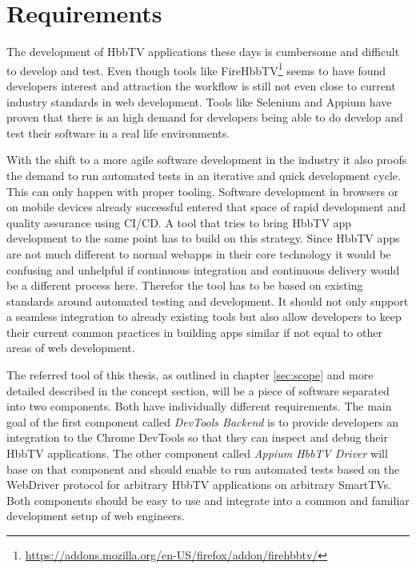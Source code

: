 \chapter{Requirements\label{cha:chapter3}}

The development of HbbTV applications these days is cumbersome and difficult to develop and test.
Even though tools like FireHbbTV\footnote{\url{https://addons.mozilla.org/en-US/firefox/addon/firehbbtv/}}
seems to have found developers interest and attraction the workflow is still not even close to
current industry standards in web development. Tools like Selenium and Appium have proven that
there is an high demand for developers being able to do develop and test their software in a real
life environments.

With the shift to a more agile software development in the industry it also proofs the demand
to run automated tests in an iterative and quick development cycle. This can only happen
with proper tooling. Software development in browsers or on mobile devices already successful
entered that space of rapid development and quality assurance using CI/CD. A tool that
tries to bring HbbTV app development to the same point has to build on this strategy. Since
HbbTV apps are not much different to normal webapps in their core technology it would be confusing
and unhelpful if continuous integration and continuous delivery would be a different process here.
Therefor the tool has to be based on existing standards around automated testing and development.
It should not only support a seamless integration to already existing tools but also allow
developers to keep their current common practices in building apps similar if not equal to other
areas of web development.

The referred tool of this thesis, as outlined in chapter \ref{sec:scope} and more detailed described
in the concept section, will be a piece of software separated into two components.
Both have individually different requirements. The main goal of the first component called
\textit{DevTools Backend} is to provide developers an integration to the Chrome DevTools so that
they can inspect and debug their HbbTV applications. The other component called \textit{Appium
HbbTV Driver} will base on that component and should enable to run automated tests based on
the WebDriver protocol for arbitrary HbbTV applications on arbitrary SmartTVs. Both components
should be easy to use and integrate into a common and familiar development setup of web engineers.

